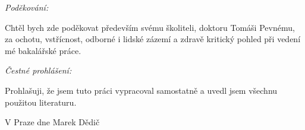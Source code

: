 \noindent \textit{\Large Poděkování:}

\noindent Chtěl bych zde poděkovat především svému školiteli, doktoru Tomáši Pevnému, za ochotu, vstřícnost, odborné i lidské zázemí a zdravě kritický pohled při vedení mé bakalářské práce.

\vfill

\noindent \textit{\Large Čestné prohlášení:}

\noindent Prohlašuji, že jsem tuto práci vypracoval samostatně a uvedl
jsem všechnu použitou literaturu.

\bigskip

\noindent V Praze dne \documentdate\hfill Marek Dědič

\vspace{2cm}
